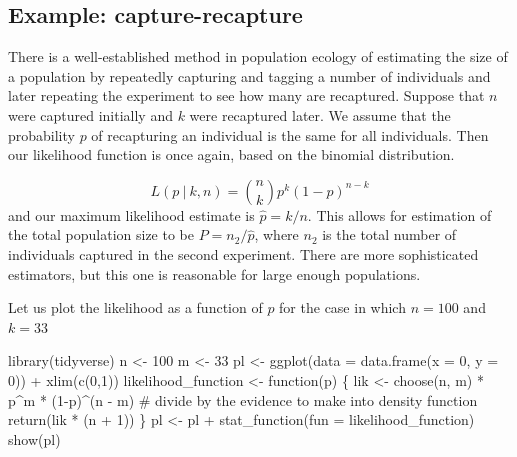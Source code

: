 \documentclass[
  letterpaper,
  DIV=11,
  numbers=noendperiod]{scrreprt}
\newenvironment{Shaded}{\begin{snugshade}}{\end{snugshade}}
\newcommand{\AttributeTok}[1]{\textcolor[rgb]{0.40,0.45,0.13}{#1}}
\newcommand{\CommentTok}[1]{\textcolor[rgb]{0.37,0.37,0.37}{#1}}
\newcommand{\ControlFlowTok}[1]{\textcolor[rgb]{0.00,0.23,0.31}{#1}}
\newcommand{\DecValTok}[1]{\textcolor[rgb]{0.68,0.00,0.00}{#1}}
\newcommand{\FunctionTok}[1]{\textcolor[rgb]{0.28,0.35,0.67}{#1}}
\newcommand{\NormalTok}[1]{\textcolor[rgb]{0.00,0.23,0.31}{#1}}
\newcommand{\OtherTok}[1]{\textcolor[rgb]{0.00,0.23,0.31}{#1}}
\newcommand{\SpecialCharTok}[1]{\textcolor[rgb]{0.37,0.37,0.37}{#1}}
\begin{document}
\hypertarget{example-capture-recapture}{%
\subsection{Example:
capture-recapture}\label{example-capture-recapture}}

There is a well-established method in population ecology of estimating
the size of a population by repeatedly capturing and tagging a number of
individuals and later repeating the experiment to see how many are
recaptured. Suppose that \(n\) were captured initially and \(k\) were
recaptured later. We assume that the probability \(p\) of recapturing an
individual is the same for all individuals. Then our likelihood function
is once again, based on the binomial distribution.

\[
L(p \ \vert \ k, n) = \binom{n}{k}p^k (1-p)^{n-k}
\] and our maximum likelihood estimate is \(\hat{p} = k /n\). This
allows for estimation of the total population size to be
\(P = n_2/\hat p\), where \(n_2\) is the total number of individuals
captured in the second experiment. There are more sophisticated
estimators, but this one is reasonable for large enough populations.

Let us plot the likelihood as a function of \(p\) for the case in which
\(n = 100\) and \(k = 33\)

\begin{Shaded}
\begin{Highlighting}[]
\FunctionTok{library}\NormalTok{(tidyverse)}
\NormalTok{n }\OtherTok{\textless{}{-}} \DecValTok{100}
\NormalTok{m }\OtherTok{\textless{}{-}} \DecValTok{33}
\NormalTok{pl }\OtherTok{\textless{}{-}} \FunctionTok{ggplot}\NormalTok{(}\AttributeTok{data =} \FunctionTok{data.frame}\NormalTok{(}\AttributeTok{x =} \DecValTok{0}\NormalTok{, }\AttributeTok{y =} \DecValTok{0}\NormalTok{)) }\SpecialCharTok{+} \FunctionTok{xlim}\NormalTok{(}\FunctionTok{c}\NormalTok{(}\DecValTok{0}\NormalTok{,}\DecValTok{1}\NormalTok{))}
\NormalTok{likelihood\_function }\OtherTok{\textless{}{-}} \ControlFlowTok{function}\NormalTok{(p) \{}
\NormalTok{  lik }\OtherTok{\textless{}{-}} \FunctionTok{choose}\NormalTok{(n, m) }\SpecialCharTok{*}\NormalTok{ p}\SpecialCharTok{\^{}}\NormalTok{m }\SpecialCharTok{*}\NormalTok{ (}\DecValTok{1}\SpecialCharTok{{-}}\NormalTok{p)}\SpecialCharTok{\^{}}\NormalTok{(n }\SpecialCharTok{{-}}\NormalTok{ m)}
  \CommentTok{\# divide by the evidence to make into density function}
  \FunctionTok{return}\NormalTok{(lik }\SpecialCharTok{*}\NormalTok{ (n }\SpecialCharTok{+} \DecValTok{1}\NormalTok{))}
\NormalTok{\}}
\NormalTok{pl }\OtherTok{\textless{}{-}}\NormalTok{ pl }\SpecialCharTok{+} \FunctionTok{stat\_function}\NormalTok{(}\AttributeTok{fun =}\NormalTok{ likelihood\_function)}
\FunctionTok{show}\NormalTok{(pl)}
\end{Highlighting}
\end{Shaded}
\end{document}
